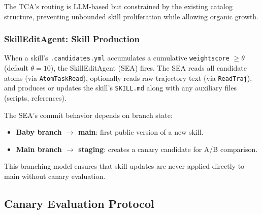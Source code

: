 \documentclass[11pt]{article}
\begin{document}
The TCA's routing is LLM-based but constrained by the existing catalog structure, preventing unbounded skill proliferation while allowing organic growth.

\subsubsection{SkillEditAgent: Skill Production}

When a skill's \texttt{.candidates.yml} accumulates a cumulative \texttt{weightscore} $\geq \theta$ (default $\theta = 10$), the SkillEditAgent (SEA) fires. The SEA reads all candidate atoms (via \texttt{AtomTaskRead}), optionally reads raw trajectory text (via \texttt{ReadTraj}), and produces or updates the skill's \texttt{SKILL.md} along with any auxiliary files (scripts, references).

The SEA's commit behavior depends on branch state:
\begin{itemize}
    \item \textbf{Baby branch $\to$ main}: first public version of a new skill.
    \item \textbf{Main branch $\to$ staging}: creates a canary candidate for A/B comparison.
\end{itemize}

This branching model ensures that skill updates are never applied directly to main without canary evaluation.

\subsection{Canary Evaluation Protocol}
\label{sec:canary}
\end{document}
